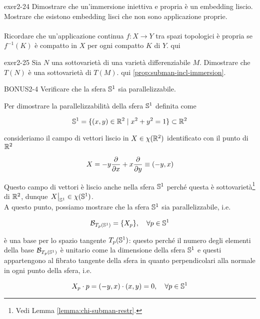 
{exer2-24}
{
Dimostrare che un'immersione iniettiva e propria è un embedding liscio. Mostrare che esistono embedding lisci che non sono applicazione proprie. \\ \\
Ricordare che un'applicazione continua $ f : X \to Y $ tra spazi topologici è propria se $ f^{-1}(K) $ è compatto in $ X $ per ogni compatto $ K $ di $ Y $.
}
{
qui
}


{exer2-25}
{
Sia $ N $ una sottovarietà di una varietà differenziabile $ M $. Dimostrare che $ T(N) $ è una sottovarietà di $ T(M) $.
}
{
qui \ref{prop:subman-incl-immersion}.
}


{BONUS2-4}
{
Verificare che la sfera $ \S^{1} $ sia parallelizzabile.
}
{
Per dimostrare la parallelizzabilità della sfera $ \S^{1} $ definita come

\begin{equation}
	\S^{1} = \{ (x,y) \in \R^{2} \mid x^{2} + y^{2} = 1 \} \subset \R^{2}
\end{equation}

consideriamo il campo di vettori liscio in $ X \in \chi(\R^{2}) $ identificato con il punto di $ \R^{2} $

\begin{equation}
	X = - y \pdv{x} + x \pdv{y} \equiv (-y,x)
\end{equation}

Questo campo di vettori è liscio anche nella sfera $ \S^{1} $ perché questa è sottovarietà\footnote{%
	Vedi Lemma \ref{lemma:chi-subman-restr}.%
} di $ \R^{2} $, dunque $ \eval{X}_{\S^{1}} \in \chi(\S^{1}) $. \\
A questo punto, possiamo mostrare che la sfera $ \S^{1} $ sia parallelizzabile, i.e.

\begin{equation}
	\B_{T_{p}(\S^{1})} = \{ X_{p} \} \qcomma \forall p \in \S^{1}
\end{equation}

è una base per lo spazio tangente $ T_{p}(\S^{1}) $: questo perché il numero degli elementi della base $ \B_{T_{p}(\S^{1})} $ è unitario come la dimensione della sfera $ \S^{1} $ e questi appartengono al fibrato tangente della sfera in quanto perpendicolari alla normale in ogni punto della sfera, i.e.

\begin{equation}
	X_{p} \cdot p = (-y,x) \cdot (x,y) = 0 \qcomma \forall p \in \S^{1}
\end{equation}
}


